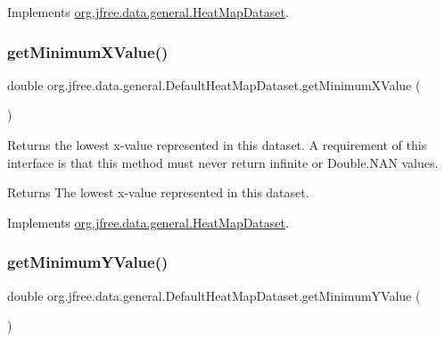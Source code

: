Implements \mbox{\hyperlink{interfaceorg_1_1jfree_1_1data_1_1general_1_1_heat_map_dataset_a263e6f91dd132e3c82bb71902f37e73c}{org.\+jfree.\+data.\+general.\+Heat\+Map\+Dataset}}.

\mbox{\label{classorg_1_1jfree_1_1data_1_1general_1_1_default_heat_map_dataset_ab15741ca0fcbd1d8224d228aef4a80b2}} 
\subsubsection{\texorpdfstring{get\+Minimum\+X\+Value()}{getMinimumXValue()}}
{\footnotesize\ttfamily double org.\+jfree.\+data.\+general.\+Default\+Heat\+Map\+Dataset.\+get\+Minimum\+X\+Value (\begin{DoxyParamCaption}{ }\end{DoxyParamCaption})}

Returns the lowest x-\/value represented in this dataset. A requirement of this interface is that this method must never return infinite or Double.\+N\+AN values.

\begin{DoxyReturn}{Returns}
The lowest x-\/value represented in this dataset. 
\end{DoxyReturn}


Implements \mbox{\hyperlink{interfaceorg_1_1jfree_1_1data_1_1general_1_1_heat_map_dataset_aa2c36fac599d77d64ea85f069eba243c}{org.\+jfree.\+data.\+general.\+Heat\+Map\+Dataset}}.

\mbox{\label{classorg_1_1jfree_1_1data_1_1general_1_1_default_heat_map_dataset_a668dc2df7c2f9e52f76d076fd1b89cd0}} 
\subsubsection{\texorpdfstring{get\+Minimum\+Y\+Value()}{getMinimumYValue()}}
{\footnotesize\ttfamily double org.\+jfree.\+data.\+general.\+Default\+Heat\+Map\+Dataset.\+get\+Minimum\+Y\+Value (\begin{DoxyParamCaption}{ }\end{DoxyParamCaption})}

